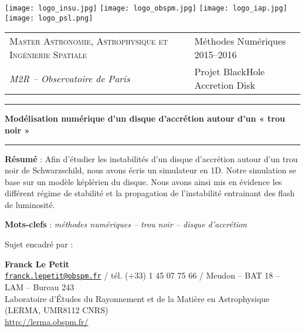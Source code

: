 \thispagestyle{empty}

\texttt{[image: logo\_insu.jpg]} \hfill
\texttt{[image: logo\_obspm.jpg]} \hfill
\texttt{[image: logo\_iap.jpg]} \hfill
\texttt{[image: logo\_psl.png]}
 
\vspace{0.5cm}

\begin{tabularx}{\textwidth}{@{} l X l @{}}
\textsc{Master Astronomie, Astrophysique et Ingénierie Spatiale} & & Méthodes Numériques 2015–2016 \\
\textit{M2R – Observatoire de Paris} & & Projet BlackHole Accretion Disk
\end{tabularx}
 
\begin{center}
 
\vspace{1.5cm}
 
\rule[11pt]{5cm}{0.5pt}
 
\textbf{\huge Modélisation numérique d’un disque d’accrétion autour d’un « trou noir »}

\rule{5cm}{0.5pt}

\vspace{1.5cm}

\parbox{15cm}{\textbf{Résumé} : Afin d'étudier les instabilités d'un disque d'accrétion autour d'un trou noir de Schwarzschild, nous avons écris un simulateur en 1D. Notre simulation se base sur un modèle képlérien du disque. Nous avons ainsi mis en évidence les différent régime de stabilité et la propagation de l'instabilité entrainant des flash de luminosité. 
} %

\vspace{0.5cm}

\parbox{15cm}{
\textbf{Mots-clefs} : \it méthodes numériques – trou noir – disque d’accrétion
} %

\vspace{0.5cm}

\parbox{15cm}{
Sujet encadré par :

\textbf{Franck Le Petit} \\
\href{mailto:franck.lepetit@obspm.fr}
{\tt franck.lepetit@obspm.fr} / tél. (+33) 1 45 07 75 66 / Meudon – BAT 18 – LAM – Bureau 243 \\
Laboratoire d’Études du Rayonnement et de la Matière en Astrophysique (LERMA, UMR8112 CNRS) \\
\url{http://lerma.obspm.fr/}

}
\end{center}
